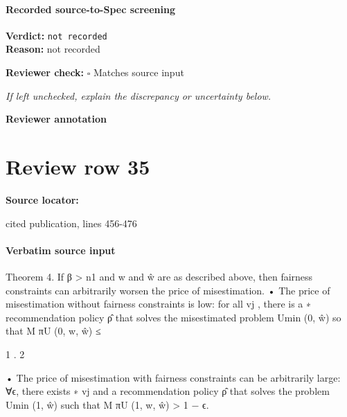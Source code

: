 \documentclass[10pt]{article}
\newcommand{\reviewerbox}{%
  \par\noindent\fbox{\parbox{0.96\linewidth}{\rule{0pt}{0.38in}}}\par
}
\newcommand{\reviewmatch}[1]{%
  \par\noindent\textbf{Reviewer check:} $\square$\; #1\par
  \noindent\emph{If left unchecked, explain the discrepancy or uncertainty below.}\par
}
\begin{document}
\paragraph{Recorded source-to-Spec screening}
\textbf{Verdict:} \texttt{not recorded}
\\
\textbf{Reason:} not recorded
\reviewmatch{Matches source input}
\noindent\textbf{Reviewer annotation}\par
\reviewerbox
\clearpage
\hypertarget{source-claim-d63dd1782000f9f6}{}
\section*{Review row 35}
\textbf{Source locator:} {\footnotesize\raggedright cited publication, lines 456-\allowbreak{}476\par}
\paragraph{Verbatim source input}
\begin{ReviewVerbatim}
Theorem 4. If β > n1 and w and ŵ are as described above, then fairness constraints can arbitrarily
worsen the price of misestimation.
• The price of misestimation without fairness constraints is low: for all {vj }, there is a
∗
recommendation policy ρ̂ that solves the misestimated problem Umin
(0, ŵ) so that
M
πU
(0, w, ŵ) ≤

1
.
2

• The price of misestimation with fairness constraints can be arbitrarily large: ∀ϵ, there exists
∗
{vj } and a recommendation policy ρ̂ that solves the problem Umin
(1, ŵ) such that
M
πU
(1, w, ŵ) > 1 − ϵ.
\end{ReviewVerbatim}
\end{document}
